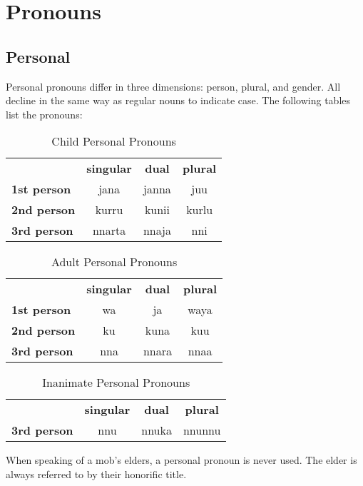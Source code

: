 \chapter{Pronouns}

\section{Personal}

Personal pronouns differ in three dimensions: person, plural, and gender. All
decline in the same way as regular nouns to indicate case. The following tables
list the pronouns:

\begin{table}[h]
\centering
\begin{tabular}{lccc}
 & \textbf{singular} & \textbf{dual} & \textbf{plural}\\
 \textbf{1st person} & jana & janna & juu\\
 \textbf{2nd person} & kurru & kunii & kurlu\\
 \textbf{3rd person} & nnarta & nnaja & nni\\
\end{tabular}
\caption{Child Personal Pronouns}
\end{table}

\begin{table}[h]
\centering
\begin{tabular}{lccc}
 & \textbf{singular} & \textbf{dual} & \textbf{plural}\\
 \textbf{1st person} & wa & ja & waya\\
 \textbf{2nd person} & ku & kuna & kuu\\
 \textbf{3rd person} & nna & nnara & nnaa\\
\end{tabular}
\caption{Adult Personal Pronouns}
\end{table}

\begin{table}[h]
\centering
\begin{tabular}{lccc}
 & \textbf{singular} & \textbf{dual} & \textbf{plural}\\
 \textbf{3rd person} & nnu & nnuka & nnunnu\\
\end{tabular}
\caption{Inanimate Personal Pronouns}
\end{table}

When speaking of a mob's elders, a personal pronoun is never used. The elder is
always referred to by their honorific title.


